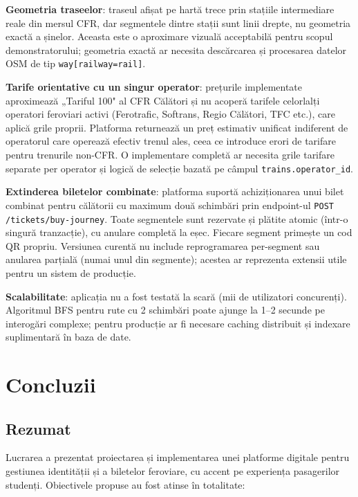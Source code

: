 \documentclass[12pt,a4paper]{report}
\begin{document}
\textbf{Geometria traseelor}: traseul afișat pe hartă trece prin stațiile intermediare reale din mersul CFR, dar segmentele dintre stații sunt linii drepte, nu geometria exactă a șinelor. Aceasta este o aproximare vizuală acceptabilă pentru scopul demonstratorului; geometria exactă ar necesita descărcarea și procesarea datelor OSM de tip \texttt{way[railway=rail]}.

\textbf{Tarife orientative cu un singur operator}: prețurile implementate aproximează „Tariful 100" al CFR Călători și nu acoperă tarifele celorlalți operatori feroviari activi (Ferotrafic, Softrans, Regio Călători, TFC etc.), care aplică grile proprii. Platforma returnează un preț estimativ unificat indiferent de operatorul care operează efectiv trenul ales, ceea ce introduce erori de tarifare pentru trenurile non-CFR. O implementare completă ar necesita grile tarifare separate per operator și logică de selecție bazată pe câmpul \texttt{trains.operator\_id}.

\textbf{Extinderea biletelor combinate}: platforma suportă achiziționarea unui bilet combinat pentru călătorii cu maximum două schimbări prin endpoint-ul \texttt{POST /tickets/buy-journey}. Toate segmentele sunt rezervate și plătite atomic (într-o singură tranzacție), cu anulare completă la eșec. Fiecare segment primește un cod QR propriu. Versiunea curentă nu include reprogramarea per-segment sau anularea parțială (numai unul din segmente); acestea ar reprezenta extensii utile pentru un sistem de producție.

\textbf{Scalabilitate}: aplicația nu a fost testată la scară (mii de utilizatori concurenți). Algoritmul BFS pentru rute cu 2 schimbări poate ajunge la 1--2 secunde pe interogări complexe; pentru producție ar fi necesare caching distribuit și indexare suplimentară în baza de date.


\chapter{Concluzii}

\section{Rezumat}

Lucrarea a prezentat proiectarea și implementarea unei platforme digitale pentru gestiunea identității și a biletelor feroviare, cu accent pe experiența pasagerilor studenți. Obiectivele propuse au fost atinse în totalitate:
\end{document}
